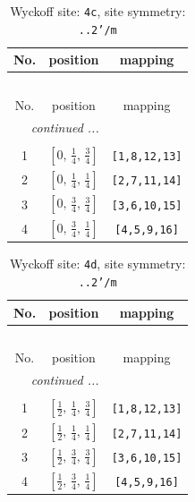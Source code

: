 \documentclass[fleqn,8pt]{jsarticle}
\begin{document}
\renewcommand{\arraystretch}{1.2}
\begin{longtable}{ccc}
\caption{Wyckoff site: {\tt 4c}, site symmetry: {\tt ..2'/m}}
 \\
 \hline \hline
No. & position & mapping \\ \hline \endfirsthead

\multicolumn{2}{l}{\tablename\ \thetable{}} \\
 \hline \hline
No. & position & mapping \\ \hline \endhead

 \hline \hline
\multicolumn{2}{r}{\footnotesize\it continued ...} \\ \endfoot

 \hline \hline
\multicolumn{2}{r}{} \\ \endlastfoot

1 & $\left[ 0,\, \frac{1}{4},\, \frac{3}{4} \right]$ & {\tt [1,8,12,13]} \\ \hline
2 & $\left[ 0,\, \frac{1}{4},\, \frac{1}{4} \right]$ & {\tt [2,7,11,14]} \\ \hline
3 & $\left[ 0,\, \frac{3}{4},\, \frac{3}{4} \right]$ & {\tt [3,6,10,15]} \\ \hline
4 & $\left[ 0,\, \frac{3}{4},\, \frac{1}{4} \right]$ & {\tt [4,5,9,16]} \\
\end{longtable}
\renewcommand{\arraystretch}{1.2}
\begin{longtable}{ccc}
\caption{Wyckoff site: {\tt 4d}, site symmetry: {\tt ..2'/m}}
 \\
 \hline \hline
No. & position & mapping \\ \hline \endfirsthead

\multicolumn{2}{l}{\tablename\ \thetable{}} \\
 \hline \hline
No. & position & mapping \\ \hline \endhead

 \hline \hline
\multicolumn{2}{r}{\footnotesize\it continued ...} \\ \endfoot

 \hline \hline
\multicolumn{2}{r}{} \\ \endlastfoot

1 & $\left[ \frac{1}{2},\, \frac{1}{4},\, \frac{3}{4} \right]$ & {\tt [1,8,12,13]} \\ \hline
2 & $\left[ \frac{1}{2},\, \frac{1}{4},\, \frac{1}{4} \right]$ & {\tt [2,7,11,14]} \\ \hline
3 & $\left[ \frac{1}{2},\, \frac{3}{4},\, \frac{3}{4} \right]$ & {\tt [3,6,10,15]} \\ \hline
4 & $\left[ \frac{1}{2},\, \frac{3}{4},\, \frac{1}{4} \right]$ & {\tt [4,5,9,16]} \\
\end{longtable}
\end{document}
